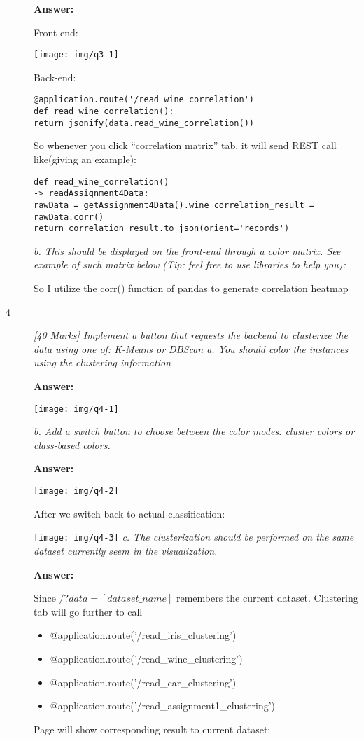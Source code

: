 \documentclass[]{report}
\begin{document}
\begin{description}
\textbf{Answer:}

Front-end:

\texttt{[image: img/q3-1]}

Back-end:

\begin{lstlisting}[frame=single]
@application.route('/read_wine_correlation') 
def read_wine_correlation():
return jsonify(data.read_wine_correlation())

\end{lstlisting}

So whenever you click “correlation matrix” tab, it will send REST call like(giving an example): 


\begin{lstlisting}[frame=single]
def read_wine_correlation() 
-> readAssignment4Data: 
rawData = getAssignment4Data().wine correlation_result = rawData.corr()
return correlation_result.to_json(orient='records')

\end{lstlisting}

{\em b.	This should be displayed on the front-end through a color matrix. See example of such matrix below (Tip: feel free to use libraries to help you):}

So I utilize the corr() function of pandas to generate correlation heatmap

\item[4]
{\em [40 Marks] Implement a button that requests the backend to clusterize the data using one of:
	K-Means or DBScan
	a.	You should color the instances using the clustering information
}


\textbf{Answer:}

\texttt{[image: img/q4-1]}

{\em b.	Add a switch button to choose between the color modes: cluster colors or class-based colors.}

\textbf{Answer:}

\texttt{[image: img/q4-2]}
\bigbreak

After we switch back to actual classification:

\texttt{[image: img/q4-3]}
\bigbreak
{\em c.	The clusterization should be performed on the same dataset currently seem in the visualization.}

\textbf{Answer:}

Since $/?data=[dataset\_name]$ remembers the current dataset. Clustering tab will go further to call 
\begin{itemize}
\item @application.route('/read\_iris\_clustering') 
\item @application.route('/read\_wine\_clustering') 
\item @application.route('/read\_car\_clustering') 
\item @application.route('/read\_assignment1\_clustering')
\end{itemize}
Page will show corresponding result to current dataset:


\end{description}
\end{document}
